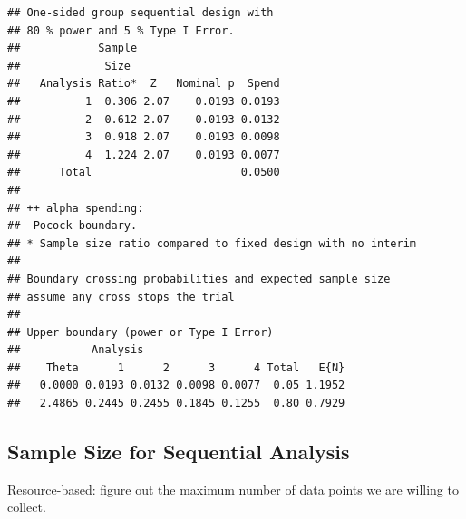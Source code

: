 \documentclass[]{article}
\newenvironment{Shaded}{\begin{snugshade}}{\end{snugshade}}
\newcommand{\KeywordTok}[1]{\textcolor[rgb]{0.13,0.29,0.53}{\textbf{#1}}}
\newcommand{\DataTypeTok}[1]{\textcolor[rgb]{0.13,0.29,0.53}{#1}}
\newcommand{\DecValTok}[1]{\textcolor[rgb]{0.00,0.00,0.81}{#1}}
\newcommand{\FloatTok}[1]{\textcolor[rgb]{0.00,0.00,0.81}{#1}}
\newcommand{\StringTok}[1]{\textcolor[rgb]{0.31,0.60,0.02}{#1}}
\newcommand{\OperatorTok}[1]{\textcolor[rgb]{0.81,0.36,0.00}{\textbf{#1}}}
\newcommand{\NormalTok}[1]{#1}
\begin{document}
\begin{verbatim}
## One-sided group sequential design with
## 80 % power and 5 % Type I Error.
##            Sample
##             Size 
##   Analysis Ratio*  Z   Nominal p  Spend
##          1  0.306 2.07    0.0193 0.0193
##          2  0.612 2.07    0.0193 0.0132
##          3  0.918 2.07    0.0193 0.0098
##          4  1.224 2.07    0.0193 0.0077
##      Total                       0.0500 
## 
## ++ alpha spending:
##  Pocock boundary.
## * Sample size ratio compared to fixed design with no interim
## 
## Boundary crossing probabilities and expected sample size
## assume any cross stops the trial
## 
## Upper boundary (power or Type I Error)
##           Analysis
##    Theta      1      2      3      4 Total   E{N}
##   0.0000 0.0193 0.0132 0.0098 0.0077  0.05 1.1952
##   2.4865 0.2445 0.2455 0.1845 0.1255  0.80 0.7929
\end{verbatim}

\subsection{Sample Size for Sequential
Analysis}\label{sample-size-for-sequential-analysis}

Resource-based: figure out the maximum number of data points we are
willing to collect.

\begin{Shaded}
\end{Shaded}
\end{document}
